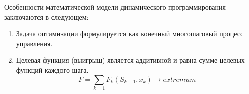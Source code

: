Особенности математической модели динамического программирования заключаются в следующем:
\begin{enumerate}
	\item Задача оптимизации формулируется как конечный многошаговый процесс управления.
	\item Целевая функция (выигрыш) является аддитивной и равна сумме целевых функций каждого шага.
		\begin{equation}
		F = \sum_{k=1}{F_k(S_{k-1},x_k)} \rightarrow extremum
		\end{equation}
\end{enumerate}